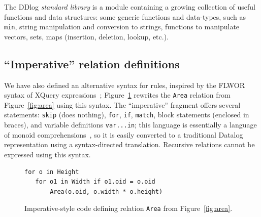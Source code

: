 The DDlog \emph{standard library} is a module containing a growing
collection of useful functions and data structures: some generic
functions and data-types, such as \texttt{min}, string manipulation
and conversion to strings, functions to manipulate vectors, sets, maps
(insertion, deletion, lookup, etc.).

\subsection{``Imperative'' relation definitions}

We have also defined an alternative syntax for rules, inspired by the
FLWOR syntax of XQuery expressions~\cite{boag-xquery02};
Figure~\ref{fig:imperative} rewrites the \texttt{Area} relation from
Figure~\ref{fig:area} using this syntax.  The ``imperative'' fragment
offers several statements: \texttt{skip} (does nothing), \texttt{for},
\texttt{if}, \texttt{match}, block statements (enclosed in braces),
and variable definitions \texttt{var...in}; this language is
essentially a language of monoid
comprehensions~\cite{fegaras-sigmod95}, so it is easily converted to a
traditional Datalog representation using a syntax-directed
translation.  Recursive relations cannot be expressed using this
syntax.

\begin{figure}[t]
  \footnotesize
  \begin{lstlisting}[language=ddlog]
for o in Height
   for o1 in Width if o1.oid = o.oid
       Area(o.oid, o.width * o.height)
  \end{lstlisting}
  \caption{Imperative-style code defining relation \texttt{Area} from
    Figure~\ref{fig:area}.
    \label{fig:imperative}}
\end{figure}
